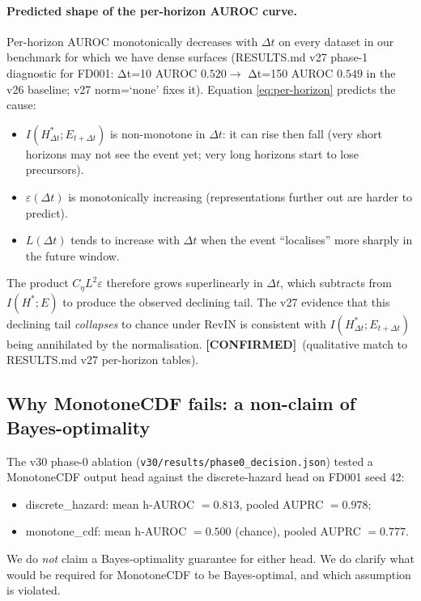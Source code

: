 \documentclass[11pt]{article}
\newcommand{\CONF}{{\color{black!60!green}\textbf{[CONFIRMED]}}}
\begin{document}
\paragraph{Predicted shape of the per-horizon AUROC curve.}
Per-horizon AUROC monotonically decreases with $\Delta t$ on every
dataset in our benchmark for which we have dense surfaces (RESULTS.md
v27 phase-1 diagnostic for FD001: Δt=10 AUROC $0.520\to$ Δt=150 AUROC
$0.549$ in the v26 baseline; v27 norm=`none' fixes it). Equation
\eqref{eq:per-horizon} predicts the cause:
\begin{itemize}[leftmargin=1.5em]
\item $I(H^*_{\Delta t};E_{t+\Delta t})$ is non-monotone in $\Delta t$:
  it can rise then fall (very short horizons may not see the event
  yet; very long horizons start to lose precursors).
\item $\varepsilon(\Delta t)$ is monotonically increasing (representations
  further out are harder to predict).
\item $L(\Delta t)$ tends to increase with $\Delta t$ when the event
  ``localises'' more sharply in the future window.
\end{itemize}
The product $C_\eta L^2\varepsilon$ therefore grows superlinearly
in $\Delta t$, which subtracts from $I(H^*;E)$ to produce the observed
declining tail. The v27 evidence that this declining tail \emph{collapses}
to chance under RevIN is consistent with $I(H^*_{\Delta t};E_{t+\Delta t})$
being annihilated by the normalisation. \CONF\ (qualitative match to
RESULTS.md v27 per-horizon tables).

\subsection{Why MonotoneCDF fails: a non-claim of Bayes-optimality}
\label{sec:monotone}

The v30 phase-0 ablation
(\texttt{v30/results/phase0\_decision.json}) tested a MonotoneCDF
output head against the discrete-hazard head on FD001 seed 42:
\begin{itemize}[leftmargin=1.5em]
\item discrete\_hazard: mean h-AUROC $=0.813$, pooled AUPRC $=0.978$;
\item monotone\_cdf:  mean h-AUROC $=0.500$ (chance), pooled AUPRC $=0.777$.
\end{itemize}
We do \emph{not} claim a Bayes-optimality guarantee for either head. We
do clarify what would be required for MonotoneCDF to be Bayes-optimal,
and which assumption is violated.
\end{document}
